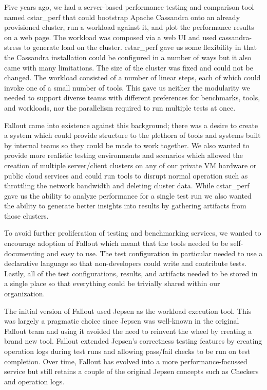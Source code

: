 \documentclass[a4paper,fleqn]{cas-dc}
\begin{document}
Five years ago, we had a server-based performance testing and comparison tool named
cstar\_perf that could bootstrap Apache Cassandra onto an already provisioned cluster,
run a workload against it, and plot the performance results on a web page. The workload was composed
via a web UI and used cassandra-stress \cite{CASSANDRASTRESS} to generate load on the cluster. cstar\_perf gave us some
flexibility in that the Cassandra installation could be configured in a number of ways but it also
came with many limitations. The size of the cluster was fixed and could not be changed. The workload
consisted of a number of linear steps, each of which could invoke one of a small number of tools.
This gave us neither the modularity we needed to support diverse teams with different preferences
for benchmarks, tools, and workloads, nor the parallelism required to run multiple tests at once.

Fallout came into existence against this background; there was a desire to create a system which
could provide structure to the plethora of tools and systems built by internal teams so they could
be made to work together. We also wanted to provide more realistic testing environments and
scenarios which allowed the creation of multiple server/client clusters on any of our private VM
hardware or public cloud services and could run tools to disrupt normal operation such as
throttling the network bandwidth and deleting cluster data. While cstar\_perf gave us the ability to analyze
performance for a single test run we also wanted the ability to generate better insights into
results by gathering artifacts from those clusters.

To avoid further proliferation of testing and benchmarking services, we wanted to encourage adoption
of Fallout which meant that the tools needed to be self-documenting and easy to use. The test
configuration in particular needed to use a declarative language so that non-developers could write
and contribute tests. Lastly, all of the test configurations, results, and artifacts needed to be
stored in a single place so that everything could be trivially shared within our organization.

The initial version of Fallout used Jepsen \cite{JEPSEN} as the workload execution tool. This was
largely a pragmatic choice since Jepsen was well-known in the original Fallout team and using it
avoided the need to reinvent the wheel by creating a brand new tool. Fallout extended Jepsen’s
correctness testing features by creating operation logs during test runs and allowing pass/fail
checks to be run on test completion. Over time, Fallout has evolved into a more performance-focussed
service but still retains a couple of the original Jepsen concepts such as Checkers and operation
logs.
\end{document}
